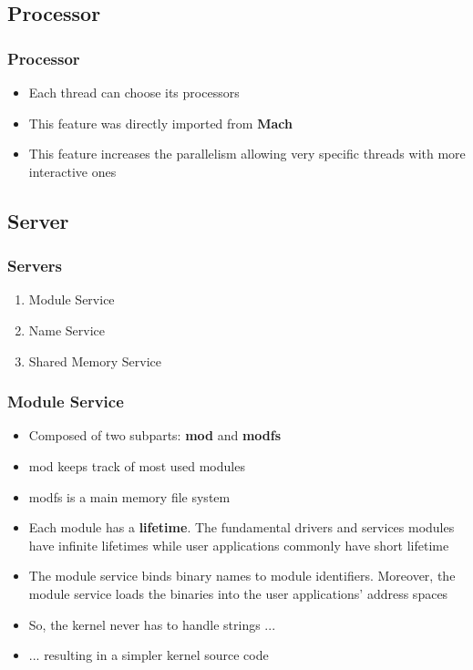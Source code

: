 \documentclass[8pt]{beamer}
\begin{document}
%
%

\subsection{Processor}


\begin{frame}
  \frametitle{Processor}

  \begin{itemize}[<+->]
    \item
      Each thread can choose its processors
    \item
      This feature was directly imported from \textbf{Mach}
    \item
      This feature increases the parallelism allowing very
      specific threads with more interactive ones
  \end{itemize}
\end{frame}

%
%

\subsection{Server}


\begin{frame}
  \frametitle{Servers}

  \begin{enumerate}
    \item
      Module Service
    \item
      Name Service
    \item
      Shared Memory Service
  \end{enumerate}
\end{frame}


\begin{frame}
  \frametitle{Module Service}

  \begin{itemize}[<+->]
    \item
      Composed of two subparts: \textbf{mod} and \textbf{modfs}
    \item
      mod keeps track of most used modules
    \item
      modfs is a main memory file system
    \item
      Each module has a \textbf{lifetime}. The fundamental drivers
      and services modules have infinite lifetimes while user applications
      commonly have short lifetime
    \item
      The module service binds binary names to module identifiers.
      Moreover, the module service loads the binaries into the
      user applications' address spaces
    \item
      So, the kernel never has to handle strings ...
    \item
      ... resulting in a simpler kernel source code
  \end{itemize}
\end{frame}
\end{document}
